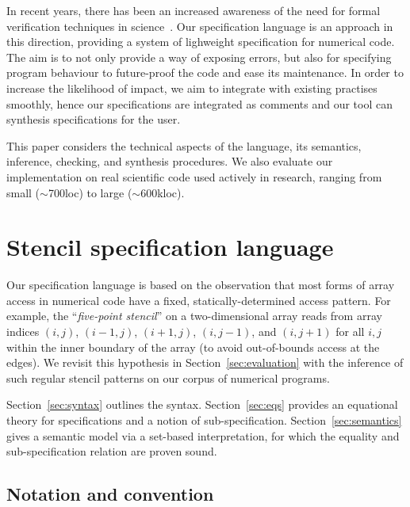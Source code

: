 \documentclass[9pt]{sigplanconf}
\theoremstyle{definition}
\begin{document}
In recent years, there has been an increased awareness
of the need for formal verification techniques in
science~\cite{post2005computational,oberkampf2010verification,orchard2014computational}.
Our specification language is an approach in this direction, providing
a system of lighweight specification for numerical code.
The aim is to not only provide a way of exposing errors, but also
for specifying program behaviour to future-proof the code and ease
its maintenance. In order to increase the likelihood of impact, we aim
to integrate with existing practises smoothly, hence our
specifications are integrated as comments and our tool can synthesis
specifications for the user.

This paper considers the technical aspects of the language,
its semantics, inference, checking, and synthesis procedures.
We also evaluate our implementation on real scientific code 
used actively in research, ranging from small ($\sim$700loc) to large
($\sim$600kloc). 

\section{Stencil specification language}
\label{sec:lang}

Our specification language is based on the observation
that most forms of array access in numerical code have
a fixed, statically-determined access pattern. For example, the
``\emph{five-point stencil}'' on a two-dimensional array reads from array
indices $(i, j)$, $(i-1, j)$, $(i+1, j)$, $(i, j-1)$, and $(i, j+1)$
for all $i, j$ within the inner boundary of the array (to avoid
out-of-bounds access at the edges). We revisit this hypothesis
in Section~\ref{sec:evaluation} with the inference of
such regular stencil patterns on our corpus of numerical programs. 

Section~\ref{sec:syntax} outlines the syntax.
 Section~\ref{sec:eqs} provides an equational
theory for specifications and a notion of
sub-specification.  Section~\ref{sec:semantics}
gives a semantic model via a set-based interpretation, for which the
equality and sub-specification relation are proven sound.

\subsection{Notation and convention}
\label{sec:notation}
\end{document}
